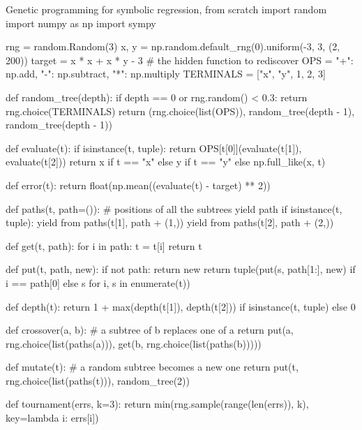 \begin{pylisting}[label={lst:gp}]{Genetic programming for symbolic regression, from scratch}
import random
import numpy as np
import sympy

rng = random.Random(3)
x, y = np.random.default_rng(0).uniform(-3, 3, (2, 200))
target = x * x + x * y - 3                        # the hidden function to rediscover
OPS = {"+": np.add, "-": np.subtract, "*": np.multiply}
TERMINALS = ["x", "y", 1, 2, 3]

def random_tree(depth):
    if depth == 0 or rng.random() < 0.3:
        return rng.choice(TERMINALS)
    return (rng.choice(list(OPS)), random_tree(depth - 1), random_tree(depth - 1))

def evaluate(t):
    if isinstance(t, tuple):
        return OPS[t[0]](evaluate(t[1]), evaluate(t[2]))
    return x if t == "x" else y if t == "y" else np.full_like(x, t)

def error(t):
    return float(np.mean((evaluate(t) - target) ** 2))

def paths(t, path=()):                            # positions of all the subtrees
    yield path
    if isinstance(t, tuple):
        yield from paths(t[1], path + (1,))
        yield from paths(t[2], path + (2,))

def get(t, path):
    for i in path:
        t = t[i]
    return t

def put(t, path, new):
    if not path:
        return new
    return tuple(put(s, path[1:], new) if i == path[0] else s for i, s in enumerate(t))

def depth(t):
    return 1 + max(depth(t[1]), depth(t[2])) if isinstance(t, tuple) else 0

def crossover(a, b):                              # a subtree of b replaces one of a
    return put(a, rng.choice(list(paths(a))), get(b, rng.choice(list(paths(b)))))

def mutate(t):                                    # a random subtree becomes a new one
    return put(t, rng.choice(list(paths(t))), random_tree(2))

def tournament(errs, k=3):
    return min(rng.sample(range(len(errs)), k), key=lambda i: errs[i])


\end{pylisting}

